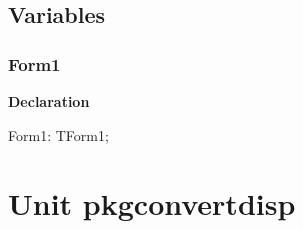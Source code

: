 \documentclass{report}
\newif\ifpdf
\begin{document}
\section{Variables}
\ifpdf
\subsection*{\large{\textbf{Form1}}\normalsize\hspace{1ex}\hrulefill}
\else
\subsection*{Form1}
\fi
\label{mnupdate-Form1}
\begin{list}{}{
\setlength{\itemindent}{0cm}
\setlength{\listparindent}{0cm}
\setlength{\leftmargin}{\evensidemargin}
\addtolength{\leftmargin}{\tmplength}
\settowidth{\labelsep}{X}
\addtolength{\leftmargin}{\labelsep}
\setlength{\labelwidth}{\tmplength}
}
\item[\textbf{Declaration}\hfill]
\ifpdf
\begin{flushleft}
\fi
\begin{ttfamily}
Form1: TForm1;\end{ttfamily}

\ifpdf
\end{flushleft}
\fi

\end{list}
\chapter{Unit pkgconvertdisp}
\label{pkgconvertdisp}
\end{document}
